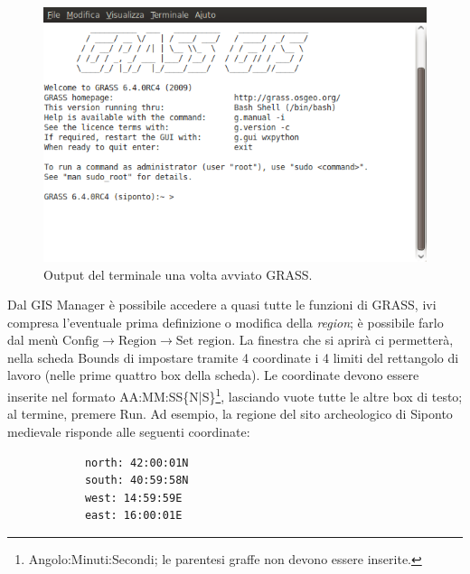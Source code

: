 		\begin{figure}
			\centering
			\includegraphics[scale=0.4]{img/screenshot_001}
			\caption{{\small \label{fig:Output-del-terminale}Output del terminale una volta avviato GRASS.}}
		\end{figure}

		Dal GIS Manager è possibile accedere a quasi tutte le funzioni di GRASS, ivi compresa l'eventuale prima definizione o modifica della \emph{region}; è possibile farlo dal menù \textsf{$\text{Config}\rightarrow\text{Region}\rightarrow\text{Set~region}$}. La finestra che si aprirà ci permetterà, nella scheda \textsf{Bounds} di impostare tramite 4 coordinate i 4 limiti del rettangolo di lavoro (nelle prime quattro box della scheda). Le coordinate devono essere inserite nel formato \textsf{AA:MM:SS\{N|S\}}\footnote{Angolo:Minuti:Secondi; le parentesi graffe non devono essere inserite.}, lasciando vuote tutte le altre box di testo; al termine, premere \textsf{Run}. Ad esempio, la regione del sito archeologico di Siponto medievale risponde alle seguenti coordinate:
		
		{\small\begin{verbatim}
			north: 42:00:01N
			south: 40:59:58N
			west: 14:59:59E
			east: 16:00:01E
			\end{verbatim}}
		
		

